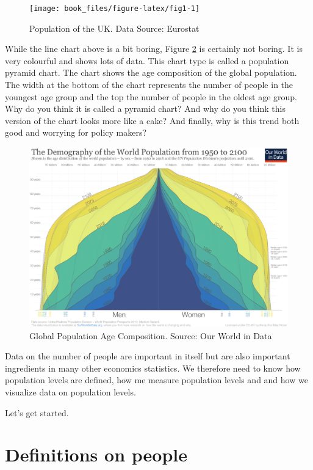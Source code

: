 \documentclass[]{book}
\begin{document}
\begin{figure}

{\centering \texttt{[image: book\_files/figure-latex/fig1-1]} 

}

\caption{\label{fig:figs}Population of the UK. Data Source: Eurostat}\label{fig:fig1}
\end{figure}

While the line chart above is a bit boring, Figure \ref{fig:fig2} is certainly not boring. It is very colourful and shows lots of data. This chart type is called a population pyramid chart. The chart shows the age composition of the global population. The width at the bottom of the chart represents the number of people in the youngest age group and the top the number of people in the oldest age group. Why do you think it is called a pyramid chart? And why do you think this version of the chart looks more like a cake? And finally, why is this trend both good and worrying for policy makers?

\begin{figure}

{\centering \includegraphics[width=0.8\linewidth]{_resources/chapter_people/poppyramid} 

}

\caption{Global Population Age Composition. Source: Our World in Data}\label{fig:fig2}
\end{figure}

Data on the number of people are important in itself but are also important ingredients in many other economics statistics. We therefore need to know how population levels are defined, how me measure population levels and and how we visualize data on population levels.

Let's get started.

\hypertarget{definitions-on-people}{%
\section{Definitions on people}\label{definitions-on-people}}
\end{document}
